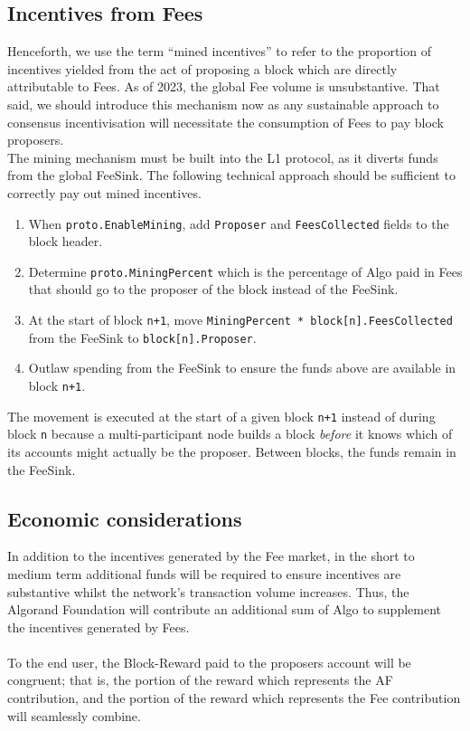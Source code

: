 \documentclass[11pt,a4paper]{article}
\begin{document}
\subsection{Incentives from Fees}
Henceforth, we use the term “mined incentives” to refer to the proportion of incentives yielded from the act of 
proposing a block which are directly attributable to Fees. As of 2023, the global Fee volume is unsubstantive. That 
said, we should introduce this mechanism now as any sustainable approach to consensus incentivisation will necessitate 
the consumption of Fees to pay block proposers. \\

The mining mechanism must be built into the L1 protocol, as it diverts funds from the global \gls{FeeSink}. The 
following technical approach should be sufficient to correctly pay out mined incentives.

\begin{enumerate}
    \item When \texttt{proto.EnableMining}, add \texttt{Proposer} and \texttt{FeesCollected} fields to the block header.
    \item Determine \texttt{proto.MiningPercent} which is the percentage of Algo paid in Fees that should go to the 
          proposer of the block instead of the \gls{FeeSink}.
    \item At the start of block \texttt{n+1}, move \texttt{MiningPercent * block[n].FeesCollected} from the 
          \gls{FeeSink} to \texttt{block[n].Proposer}.
    \item Outlaw spending from the \gls{FeeSink} to ensure the funds above are available in block \texttt{n+1}.
\end{enumerate}

The movement is executed at the start of a given block \texttt{n+1} instead of during block \texttt{n} because a 
multi-participant node builds a block \textit{before} it knows which of its accounts might actually be the proposer. 
Between blocks, the funds remain in the \gls{FeeSink}.

\subsection{Economic considerations} \label{subsec:eco}
In addition to the incentives generated by the Fee market, in the short to medium term additional funds will be required
to ensure incentives are substantive whilst the network's transaction volume increases. Thus, the Algorand Foundation 
will contribute an additional sum of Algo to supplement the incentives generated by Fees. \\ \\
To the end user, the \gls{Block-Reward} paid to the proposers account will be congruent; that is, the portion of the
reward which represents the AF contribution, and the portion of the reward which represents the Fee contribution will
seamlessly combine.
\end{document}
